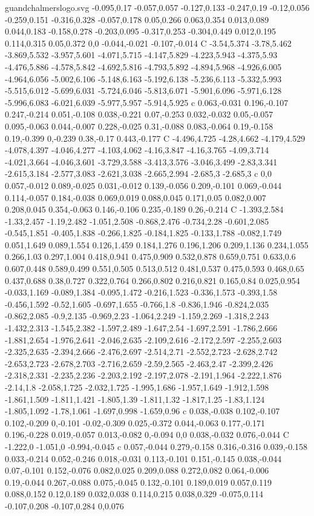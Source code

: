 \begin{filecontents}[noheader]{guandchalmerslogo.svg}
-0.095,0.17 -0.057,0.057 -0.127,0.133 -0.247,0.19 -0.12,0.056 -0.259,0.151 -0.316,0.328 -0.057,0.178 0.05,0.266 0.063,0.354 0.013,0.089 0.044,0.183 -0.158,0.278 -0.203,0.095 -0.317,0.253 -0.304,0.449 0.012,0.195 0.114,0.315 0.05,0.372 0,0 -0.044,-0.021 -0.107,-0.014 C -3.54,5.374 -3.78,5.462 -3.869,5.532 -3.957,5.601 -4.071,5.715 -4.147,5.829 -4.223,5.943 -4.375,5.93 -4.476,5.886 -4.578,5.842 -4.692,5.816 -4.793,5.892 -4.894,5.968 -4.926,6.005 -4.964,6.056 -5.002,6.106 -5.148,6.163 -5.192,6.138 -5.236,6.113 -5.332,5.993 -5.515,6.012 -5.699,6.031 -5.724,6.046 -5.813,6.071 -5.901,6.096 -5.971,6.128 -5.996,6.083 -6.021,6.039 -5.977,5.957 -5.914,5.925 c 0.063,-0.031 0.196,-0.107 0.247,-0.214 0.051,-0.108 0.038,-0.221 0.07,-0.253 0.032,-0.032 0.05,-0.057 0.095,-0.063 0.044,-0.007 0.228,-0.025 0.31,-0.088 0.083,-0.064 0.19,-0.158 0.19,-0.399 0,-0.239 0.38,-0.17 0.443,-0.177 C -4.496,4.725 -4.28,4.662 -4.179,4.529 -4.078,4.397 -4.046,4.277 -4.103,4.062 -4.16,3.847 -4.16,3.765 -4.09,3.714 -4.021,3.664 -4.046,3.601 -3.729,3.588 -3.413,3.576 -3.046,3.499 -2.83,3.341 -2.615,3.184 -2.577,3.083 -2.621,3.038 -2.665,2.994 -2.685,3 -2.685,3 c 0,0 0.057,-0.012 0.089,-0.025 0.031,-0.012 0.139,-0.056 0.209,-0.101 0.069,-0.044 0.114,-0.057 0.184,-0.038 0.069,0.019 0.088,0.045 0.171,0.05 0.082,0.007 0.208,0.045 0.354,-0.063 0.146,-0.106 0.235,-0.189 0.26,-0.214 C -1.393,2.584 -1.33,2.457 -1.19,2.482 -1.051,2.508 -0.868,2.476 -0.734,2.28 -0.601,2.085 -0.545,1.851 -0.405,1.838 -0.266,1.825 -0.184,1.825 -0.133,1.788 -0.082,1.749 0.051,1.649 0.089,1.554 0.126,1.459 0.184,1.276 0.196,1.206 0.209,1.136 0.234,1.055 0.266,1.03 0.297,1.004 0.418,0.941 0.475,0.909 0.532,0.878 0.659,0.751 0.633,0.6 0.607,0.448 0.589,0.499 0.551,0.505 0.513,0.512 0.481,0.537 0.475,0.593 0.468,0.65 0.437,0.688 0.38,0.727 0.322,0.764 0.266,0.802 0.216,0.821 0.165,0.84 0.025,0.954 -0.033,1.169 -0.089,1.384 -0.095,1.472 -0.216,1.523 -0.336,1.573 -0.393,1.58 -0.456,1.592 -0.52,1.605 -0.697,1.655 -0.766,1.8 -0.836,1.946 -0.824,2.035 -0.862,2.085 -0.9,2.135 -0.969,2.23 -1.064,2.249 -1.159,2.269 -1.318,2.243 -1.432,2.313 -1.545,2.382 -1.597,2.489 -1.647,2.54 -1.697,2.591 -1.786,2.666 -1.881,2.654 -1.976,2.641 -2.046,2.635 -2.109,2.616 -2.172,2.597 -2.255,2.603 -2.325,2.635 -2.394,2.666 -2.476,2.697 -2.514,2.71 -2.552,2.723 -2.628,2.742 -2.653,2.723 -2.678,2.703 -2.716,2.659 -2.59,2.565 -2.463,2.47 -2.399,2.426 -2.318,2.331 -2.235,2.236 -2.203,2.192 -2.197,2.078 -2.191,1.964 -2.222,1.876 -2.14,1.8 -2.058,1.725 -2.032,1.725 -1.995,1.686 -1.957,1.649 -1.912,1.598 -1.861,1.509 -1.811,1.421 -1.805,1.39 -1.811,1.32 -1.817,1.25 -1.83,1.124 -1.805,1.092 -1.78,1.061 -1.697,0.998 -1.659,0.96 c 0.038,-0.038 0.102,-0.107 0.102,-0.209 0,-0.101 -0.02,-0.309 0.025,-0.372 0.044,-0.063 0.177,-0.171 0.196,-0.228 0.019,-0.057 0.013,-0.082 0,-0.094 0,0 0.038,-0.032 0.076,-0.044 C -1.222,0 -1.051,0 -0.994,-0.045 c 0.057,-0.044 0.279,-0.158 0.316,-0.316 0.039,-0.158 0.033,-0.214 0.052,-0.246 0.018,-0.031 0.113,-0.101 0.151,-0.145 0.038,-0.044 0.07,-0.101 0.152,-0.076 0.082,0.025 0.209,0.088 0.272,0.082 0.064,-0.006 0.19,-0.044 0.267,-0.088 0.075,-0.045 0.132,-0.101 0.189,0.019 0.057,0.119 0.088,0.152 0.12,0.189 0.032,0.038 0.114,0.215 0.038,0.329 -0.075,0.114 -0.107,0.208 -0.107,0.284 0,0.076 
\end{filecontents}
